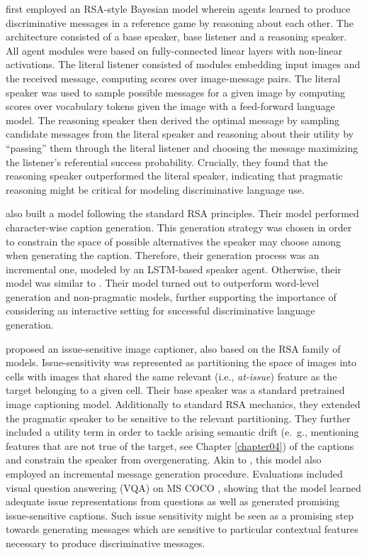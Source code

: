 \cite{andreas2016reasoning} first employed an RSA-style Bayesian model wherein agents learned to produce discriminative messages in a reference game by reasoning about each other. The architecture consisted of a base speaker, base listener and a reasoning speaker. All agent modules were based on fully-connected linear layers with non-linear activations. The literal listener consisted of modules embedding input images and the received message, computing scores over image-message pairs. The literal speaker was used to sample possible messages for a given image by computing scores over vocabulary tokens given the image with a feed-forward language model. The reasoning speaker then derived the optimal message by sampling candidate messages from the literal speaker and reasoning about their utility by ``passing'' them through the literal listener and choosing the message maximizing the listener's referential success probability. 
Crucially, they found that the reasoning speaker outperformed the literal speaker, indicating that pragmatic reasoning might be critical for modeling discriminative language use. 

\cite{cohn2018pragmatically} also built a model following the standard RSA principles. Their model performed character-wise caption generation. This generation strategy was chosen in order to constrain the space of possible alternatives the speaker may choose among when generating the caption. Therefore, their generation process was an incremental one, modeled by an LSTM-based speaker agent. Otherwise, their model was similar to \cite{andreas2016reasoning}. Their model  turned out to outperform word-level generation and non-pragmatic models, further supporting the importance of considering an interactive setting for successful discriminative language generation.

\cite{nie2020pragmatic} proposed an issue-sensitive image captioner, also based on the RSA family of models. Issue-sensitivity was represented as partitioning the space of images into cells with images that shared the same relevant (i.e., \textit{at-issue}) feature as the target belonging to a given cell. Their base speaker was a standard  pretrained image captioning model. Additionally to standard RSA mechanics, they extended the pragmatic speaker to be sensitive to the relevant partitioning. They further included a utility term in order to tackle arising semantic drift (e.~g., mentioning features that are not true of the target, see Chapter \ref{chapter04}) of the captions and constrain the speaker from overgenerating. Akin to \cite{cohn2018pragmatically}, this model also employed an incremental message generation procedure. Evaluations included visual question answering (VQA) on MS COCO \parencite{chen2015microsoft}, showing that the model learned adequate issue representations from questions as well as generated promising issue-sensitive captions. Such issue sensitivity might be seen as a promising step towards generating messages which are sensitive to particular contextual features necessary to produce discriminative messages. 

